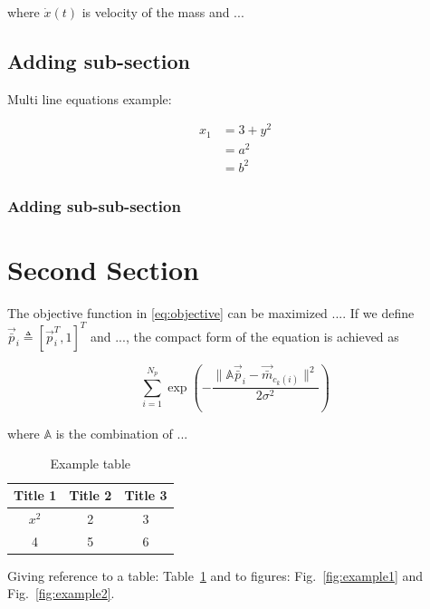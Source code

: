 \documentclass[letterpaper,12pt]{article}
\begin{document}
\noindent
where $\dot{x}(t)$ is velocity of the mass and ...

\subsection{Adding sub-section}

Multi line equations example:

\begin{align} %
x_1&=3 + y^2 \\
&= a^2  \nonumber \\  %
&= b^2
\end{align}

\subsubsection{Adding sub-sub-section}

\lipsum[3]

\section{Second Section}

The objective function in \eqref{eq:objective} can be maximized .... If we define $\vec{\bar{p}}_i\triangleq \left[\vec{p}_i^T, 1 \right]^T$ and ..., the compact form of the equation is achieved as 

\begin{equation}
\label{eq:objective}
\sum_{i=1}^{\mathit{N_p}}\exp \left( -\dfrac{\lVert\mathbb{A}\vec{\bar{p}}_i-\vec{\bar{m}}_{c_{k}(i)}\rVert^2}{2\sigma^2}\right)
\end{equation}

\noindent
where $\mathbf{\mathbb{A}}$ is the combination of ... \lipsum[2]

\begin{table} 
\caption{Example table}
\label{tbl:exampleTable}
\centering   %
\begin{tabular}{c c c} %
\toprule \toprule
Title 1 & {\bf Title 2} & Title 3 \\ \hline
$x^2$        & 2              & 3        \\
4        & 5              & 6        \\ \bottomrule
\end{tabular}
\end{table}

Giving reference to a table: Table~\ref{tbl:exampleTable} and to figures: Fig.~\ref{fig:example1} and Fig.~\ref{fig:example2}.
\end{document}
